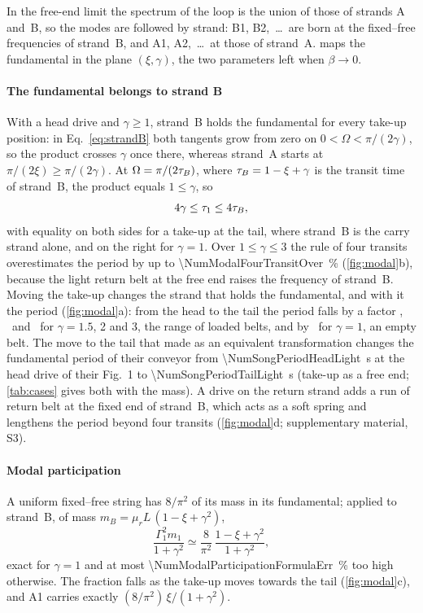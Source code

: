 In the free-end limit the spectrum of the loop is the union of those of strands A and~B, so the
modes are followed by strand: B1, B2,~\dots\ are born at the fixed--free frequencies of
strand~B, and A1, A2,~\dots\ at those of strand~A.  maps the fundamental in the
plane $(\xi,\gamma)$, the two parameters left when $\beta\to0$.

\paragraph{The fundamental belongs to strand B} With a head drive and $\gamma\ge1$, strand~B
holds the fundamental for every take-up position: in Eq.~\eqref{eq:strandB} both tangents grow
from zero on $0<\Omega<\pi/(2\gamma)$, so the product crosses $\gamma$ once there, whereas
strand~A starts at $\pi/(2\xi)\ge\pi/(2\gamma)$. At $\Omega=\pi/(2\tau_B)$, where
$\tau_B=1-\xi+\gamma$ is the transit time of strand~B, the product equals $1\le\gamma$, so
\begin{equation}\label{eq:bounds_head}
  4\gamma\le\tau_{1}\le4\tau_B ,
\end{equation}
with equality on both sides for a take-up at the tail, where strand~B is the carry strand
alone, and on the right for $\gamma=1$. Over $1\le\gamma\le3$ the rule of four transits
overestimates the period by up to \qty{\NumModalFourTransitOver}{\percent}
(\cref{fig:modal}b), because the light return belt at the free end raises the frequency of
strand~B. Moving the take-up changes the strand that holds the fundamental, and with it the
period (\cref{fig:modal}a): from the head to the tail the period falls by a factor
\NumHeadTailRatioGammaOneFive, \NumHeadTailRatioGammaTwo\ and \NumHeadTailRatioGammaThree\ for
$\gamma=1.5$, 2 and 3, the range of loaded belts, and by \NumHeadTailRatioGammaOne\ for
$\gamma=1$, an empty belt. The move to the tail that \citet{song2012} made as an equivalent
transformation changes the fundamental period of their conveyor from
\qty{\NumSongPeriodHeadLight}{\second} at the head drive of their Fig.~1 to
\qty{\NumSongPeriodTailLight}{\second} (take-up as a free end; \cref{tab:cases} gives both with
the mass). A drive on the return strand adds a run of return belt at the fixed end of strand~B,
which acts as a soft spring and lengthens the period beyond four transits (\cref{fig:modal}d;
supplementary material, S3).

\paragraph{Modal participation} A uniform fixed--free string has $8/\pi^2$ of its mass in its
fundamental; applied to strand~B, of mass $m_B=\mu_rL\,(1-\xi+\gamma^2)$,
\begin{equation}\label{eq:F1}
  \frac{\Gamma_1^2m_1}{1+\gamma^2}\simeq\frac{8}{\pi^2}\,\frac{1-\xi+\gamma^2}{1+\gamma^2},
\end{equation}
exact for $\gamma=1$ and at most \qty{\NumModalParticipationFormulaErr}{\percent} too high
otherwise. The fraction falls as the take-up moves towards the tail (\cref{fig:modal}c), and
A1 carries exactly $(8/\pi^2)\,\xi/(1+\gamma^2)$.


